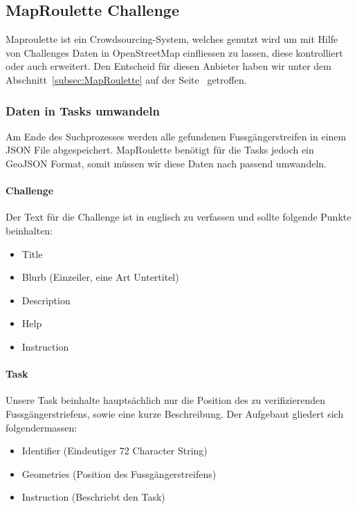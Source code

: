 \subsection{MapRoulette Challenge}
Maproulette ist ein Crowdsourcing-System, welches genutzt wird um mit Hilfe von Challenges Daten in OpenStreetMap einfliessen zu lassen, diese kontrolliert oder auch erweitert. Den Entscheid für diesen Anbieter haben wir unter dem Abschnitt~\ref{subsec:MapRoulette} auf der Seite~\pageref{subsec:MapRoulette} getroffen.

\subsubsection{Daten in Tasks umwandeln}
Am Ende des Suchprozesses werden alle gefundenen Fussgängerstreifen in einem JSON File abgespeichert. MapRoulette benötigt für die Tasks jedoch ein GeoJSON Format, somit müssen wir diese Daten nach passend umwandeln. 

\paragraph{Challenge} Der Text für die Challenge ist in englisch zu verfassen und sollte folgende Punkte beinhalten:
\begin{itemize}
	\item Title
	\item Blurb (Einzeiler, eine Art Untertitel)
	\item Description
	\item Help
	\item Instruction
\end{itemize}

\paragraph{Task} Unsere Task beinhalte hauptsächlich nur die Position des zu verifizierenden Fussgängerstriefens, sowie eine kurze Beschreibung. Der Aufgebaut gliedert sich folgendermassen:
\begin{itemize}
	\item Identifier (Eindeutiger 72 Character String)
	\item Geometries (Position des Fussgängerstreifens)
	\item Instruction (Beschriebt den Task)
\end{itemize}